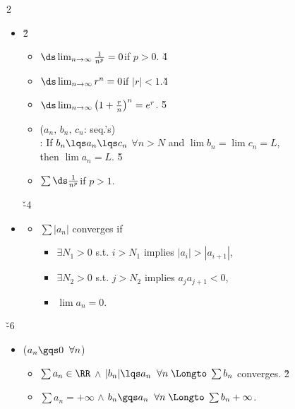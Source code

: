 \documentclass[dvipdfmx,a4paper,titlepage,9pt]{jsarticle}
\begin{document}
\begin{multicols*}{2}
\begin{itemize}[label={-}]
\vfill\null\columnbreak

\item{} \v2
\begin{itemize}[label={$\cdot$}]
\setlength{\leftskip}{-10pt}
\item $\ds\lim_{n\to\infty}\frac1{n^p}=0$\quad if $p>0$. \v4
\item $\ds\lim_{n\to\infty}r^n=0$\quad if $|r|<1$.\v4
\item $\ds\lim_{n\to\infty}\left(1+\frac rn\right)^n=e^r$. \v5
\item {} ($a_n,\,b_n,\,c_n$: seq.'s) \\
               : If $b_n\lqs a_n\lqs c_n$ $\forall n>N$ and $\lim b_n=\lim c_n=L$,\\
               \;\;then $\lim a_n=L.$ \v5
\item $\sum\ds\frac1{n^p}$\quad if $p>1$. 
\end{itemize}

\; \v{-4}

\item{}
\begin{itemize}
\setlength{\leftskip}{-10pt}
\item[:] $\sum |a_n|$ converges if 
\begin{itemize}
\setlength{\leftskip}{-10pt}
\item[(i)] $\exists N_1>0$ s.t. $i>N_1$ implies $|a_i|>|a_{i+1}|$,
\item[(ii)] $\exists N_2>0$ s.t. $j>N_2$ implies $a_ja_{j+1}<0$,
\item[(iii)] $\lim a_n=0$.
\end{itemize}
\end{itemize}
\end{itemize}

\;

 \v{-6}
\begin{itemize}[label={-}]
\item{} {\color{Gray}($a_n\gqs0\;\;\forall n$)}
\begin{itemize}[label={$\cdot$}]
\setlength{\leftskip}{-10pt}
\item $\sum a_n\in\RR$ $\wedge$ $|b_n|\lqs a_n\;\;\forall n\;\Longto\;\sum b_n$ converges. \v2
\item $\sum a_n=+\infty$ $\wedge$ $b_n\gqs a_n\;\;\forall n\;\Longto\;\sum b_n+\infty$.
\end{itemize}


\end{itemize}
\end{multicols*}
\end{document}
